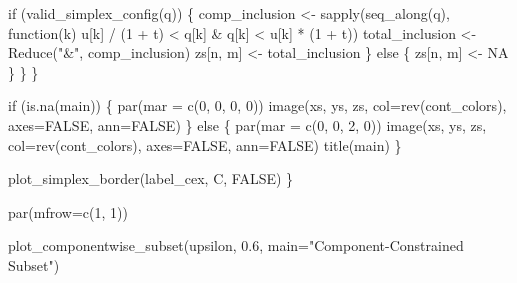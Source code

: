 \documentclass[
  letterpaper,
  DIV=11,
  numbers=noendperiod]{scrartcl}
\newenvironment{Shaded}{\begin{snugshade}}{\end{snugshade}}
\newcommand{\AttributeTok}[1]{\textcolor[rgb]{0.40,0.45,0.13}{#1}}
\newcommand{\ConstantTok}[1]{\textcolor[rgb]{0.56,0.35,0.01}{#1}}
\newcommand{\ControlFlowTok}[1]{\textcolor[rgb]{0.00,0.23,0.31}{#1}}
\newcommand{\DecValTok}[1]{\textcolor[rgb]{0.68,0.00,0.00}{#1}}
\newcommand{\FloatTok}[1]{\textcolor[rgb]{0.68,0.00,0.00}{#1}}
\newcommand{\FunctionTok}[1]{\textcolor[rgb]{0.28,0.35,0.67}{#1}}
\newcommand{\NormalTok}[1]{\textcolor[rgb]{0.00,0.23,0.31}{#1}}
\newcommand{\OtherTok}[1]{\textcolor[rgb]{0.00,0.23,0.31}{#1}}
\newcommand{\SpecialCharTok}[1]{\textcolor[rgb]{0.37,0.37,0.37}{#1}}
\newcommand{\StringTok}[1]{\textcolor[rgb]{0.13,0.47,0.30}{#1}}
\begin{document}
\begin{Shaded}
\begin{Highlighting}[]
      \ControlFlowTok{if}\NormalTok{ (}\FunctionTok{valid\_simplex\_config}\NormalTok{(q)) \{}
\NormalTok{        comp\_inclusion }\OtherTok{\textless{}{-}} \FunctionTok{sapply}\NormalTok{(}\FunctionTok{seq\_along}\NormalTok{(q),}
                                 \ControlFlowTok{function}\NormalTok{(k) u[k] }\SpecialCharTok{/}\NormalTok{ (}\DecValTok{1} \SpecialCharTok{+}\NormalTok{ t) }\SpecialCharTok{\textless{}}\NormalTok{ q[k] }\SpecialCharTok{\&}
\NormalTok{                                             q[k] }\SpecialCharTok{\textless{}}\NormalTok{ u[k] }\SpecialCharTok{*}\NormalTok{ (}\DecValTok{1} \SpecialCharTok{+}\NormalTok{ t))}
\NormalTok{        total\_inclusion }\OtherTok{\textless{}{-}} \FunctionTok{Reduce}\NormalTok{(}\StringTok{"\&"}\NormalTok{, comp\_inclusion)}
\NormalTok{        zs[n, m] }\OtherTok{\textless{}{-}}\NormalTok{ total\_inclusion}
\NormalTok{      \} }\ControlFlowTok{else}\NormalTok{ \{}
\NormalTok{        zs[n, m] }\OtherTok{\textless{}{-}} \ConstantTok{NA}
\NormalTok{      \}}
\NormalTok{    \}}
\NormalTok{  \}}

  \ControlFlowTok{if}\NormalTok{ (}\FunctionTok{is.na}\NormalTok{(main)) \{}
    \FunctionTok{par}\NormalTok{(}\AttributeTok{mar =} \FunctionTok{c}\NormalTok{(}\DecValTok{0}\NormalTok{, }\DecValTok{0}\NormalTok{, }\DecValTok{0}\NormalTok{, }\DecValTok{0}\NormalTok{))}
    \FunctionTok{image}\NormalTok{(xs, ys, zs, }\AttributeTok{col=}\FunctionTok{rev}\NormalTok{(cont\_colors), }\AttributeTok{axes=}\ConstantTok{FALSE}\NormalTok{, }\AttributeTok{ann=}\ConstantTok{FALSE}\NormalTok{)}
\NormalTok{  \} }\ControlFlowTok{else}\NormalTok{ \{}
    \FunctionTok{par}\NormalTok{(}\AttributeTok{mar =} \FunctionTok{c}\NormalTok{(}\DecValTok{0}\NormalTok{, }\DecValTok{0}\NormalTok{, }\DecValTok{2}\NormalTok{, }\DecValTok{0}\NormalTok{))}
    \FunctionTok{image}\NormalTok{(xs, ys, zs, }\AttributeTok{col=}\FunctionTok{rev}\NormalTok{(cont\_colors), }\AttributeTok{axes=}\ConstantTok{FALSE}\NormalTok{, }\AttributeTok{ann=}\ConstantTok{FALSE}\NormalTok{)}
    \FunctionTok{title}\NormalTok{(main)}
\NormalTok{  \}}

  \FunctionTok{plot\_simplex\_border}\NormalTok{(label\_cex, C, }\ConstantTok{FALSE}\NormalTok{)}
\NormalTok{\}}
\end{Highlighting}
\end{Shaded}

\begin{Shaded}
\begin{Highlighting}[]
\FunctionTok{par}\NormalTok{(}\AttributeTok{mfrow=}\FunctionTok{c}\NormalTok{(}\DecValTok{1}\NormalTok{, }\DecValTok{1}\NormalTok{))}

\FunctionTok{plot\_componentwise\_subset}\NormalTok{(upsilon, }\FloatTok{0.6}\NormalTok{, }\AttributeTok{main=}\StringTok{"Component{-}Constrained Subset"}\NormalTok{)}
\end{Highlighting}
\end{Shaded}
\end{document}
